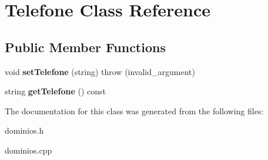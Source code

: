 \hypertarget{classTelefone}{}\section{Telefone Class Reference}
\label{classTelefone}
\subsection*{Public Member Functions}
\begin{DoxyCompactItemize}
\item 
\mbox{\label{classTelefone_a79516b37434ff927bd2a9bd66080a36d}} 
void {\bfseries set\+Telefone} (string)  throw (invalid\+\_\+argument)
\item 
\mbox{\label{classTelefone_a64d1e99657fde65bb698ddcd56e7eb04}} 
string {\bfseries get\+Telefone} () const
\end{DoxyCompactItemize}


The documentation for this class was generated from the following files\+:\begin{DoxyCompactItemize}
\item 
dominios.\+h\item 
dominios.\+cpp\end{DoxyCompactItemize}
